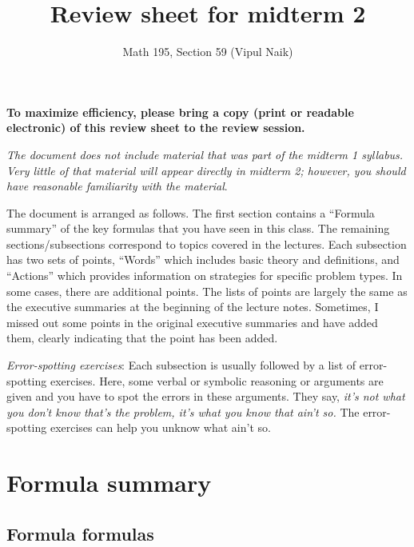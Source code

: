 \documentclass[10pt]{amsart}
\title{Review sheet for midterm 2}
\author{Math 195, Section 59 (Vipul Naik)}
\begin{document}
\maketitle

{\bf To maximize efficiency, please bring a copy (print or readable
electronic) of this review sheet to the review session.}

{\em The document does not include material that was part of the
midterm 1 syllabus. Very little of that material will appear directly
in midterm 2; however, you should have reasonable familiarity with the
material}.

The document is arranged as follows. The first section contains a
``Formula summary'' of the key formulas that you have seen in this
class. The remaining sections/subsections correspond to topics covered
in the lectures. Each subsection has two sets of points, ``Words''
which includes basic theory and definitions, and ``Actions'' which
provides information on strategies for specific problem types. In some
cases, there are additional points. The lists of points are largely
the same as the executive summaries at the beginning of the lecture
notes. Sometimes, I missed out some points in the original executive
summaries and have added them, clearly indicating that the point has
been added.

{\em Error-spotting exercises}: Each subsection is usually followed by
a list of error-spotting exercises. Here, some verbal or symbolic
reasoning or arguments are given and you have to spot the errors in
these arguments. They say, {\em it's not what you don't know that's
the problem, it's what you know that ain't so.} The error-spotting
exercises can help you unknow what ain't so.

\section{Formula summary}

\subsection{Formula formulas}
\end{document}
